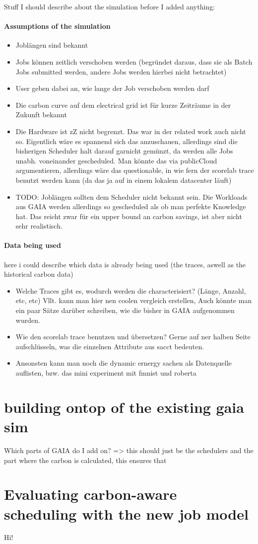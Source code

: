 Stuff I should describe about the simulation before I added anything:

\paragraph{Assumptions of the simulation}

\begin{itemize}
    \item Joblängen sind bekannt
    \item Jobs können zeitlich verschoben werden (begründet daraus, dass sie als Batch Jobs submitted werden, andere Jobs werden hierbei nicht betrachtet)
    \item User geben dabei an, wie lange der Job verschoben werden darf
    \item Die carbon curve auf dem electrical grid ist für kurze Zeiträume in der Zukunft bekannt
    \item Die Hardware ist zZ nicht begrenzt. Das war in der related work auch nicht so. Eigentlich wäre es spannend sich das anzuschauen, allerdings sind die bisherigen Scheduler halt darauf garnicht gemünzt, da werden alle Jobs unabh. voneinander gescheduled. Man könnte das via publicCloud argumentieren, allerdings wäre das questionable, in wie fern der scorelab trace benutzt werden kann (da das ja auf in einem lokalem datacenter läuft)
    \item TODO: Joblängen sollten dem Scheduler nicht bekannt sein. Die Workloads aus GAIA werden allerdings so gescheduled als ob man perfekte Knowledge hat. Das reicht zwar für ein upper bound an carbon savings, ist aber nicht sehr realistisch.  
\end{itemize}

\paragraph{Data being used}

here i could describe which data is already being used (the traces, aswell as the historical carbon data)
\begin{itemize}
    \item Welche Traces gibt es, wodurch werden die characterisiert? (Länge, Anzahl, etc, etc) Vllt. kann man hier nen coolen vergleich erstellen, Auch könnte man ein paar Sätze darüber schreiben, wie die bisher in GAIA aufgenommen wurden.
    \item Wie den scorelab trace benutzen und übersetzen? Gerne auf ner halben Seite aufschlüsseln, was die einzelnen Attribute aus sacct bedeuten.
    \item Ansonsten kann man noch die dynamic ernergy sachen als Datenquelle auflisten, bzw. das mini experiment mit fmnist und roberta 
\end{itemize}


\section{building ontop of the existing gaia sim}

Which parts of GAIA do I add on?
=> this should just be the schedulers and the part where the carbon is calculated, this ensures that 

\section{Evaluating carbon-aware scheduling with the new job model}

Hi!
